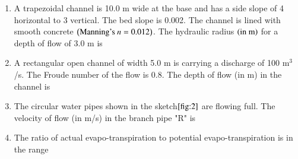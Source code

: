 \documentclass[journal]{IEEEtran}
\numberwithin{equation}{enumi}
\numberwithin{figure}{enumi}
\begin{document}
\begin{enumerate}
\item A trapezoidal channel is 10.0 m wide at the base and has a side slope of 4 horizontal to 3 vertical. The bed slope is 0.002. The channel is lined with smooth concrete $\left(\text{Manning's } n=0.012\right)$. The hydraulic radius $\left(\text{in m}\right)$ for a depth of flow of 3.0 m is

\begin{enumerate}
\end{enumerate}

\item A rectangular open channel of width 5.0 m is carrying a discharge of 100 m$^3$/s. The Froude number of the flow is 0.8. The depth of flow (in m) in the channel is

\begin{enumerate}
\end{enumerate}
\item The circular water pipes shown in the sketch$\ref{fig:2}$ are flowing full. The velocity of flow (in m/s) in the branch pipe "R" is
\begin{figure}[H]
    \centering
    
    \caption{}
    \label{fig:2}
\end{figure}

\begin{enumerate}
\end{enumerate}

\item The ratio of actual evapo-transpiration to potential evapo-transpiration is in the range


\end{enumerate}
\end{document}
